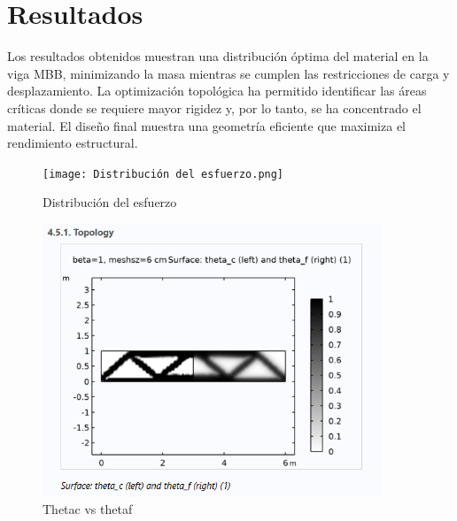 \documentclass{article}
\theoremstyle{mytheoremstyle}
\theoremstyle{mytheoremstyle}
\theoremstyle{myproblemstyle}
\begin{document}
\section{Resultados}
Los resultados obtenidos muestran una distribución óptima del material en la viga MBB, minimizando la masa mientras se cumplen las restricciones de carga y desplazamiento. La optimización topológica ha permitido identificar las áreas críticas donde se requiere mayor rigidez y, por lo tanto, se ha concentrado el material. El diseño final muestra una geometría eficiente que maximiza el rendimiento estructural.
 \begin{figure}[H]
              \centering
              \texttt{[image: Distribución del esfuerzo.png]}
              \caption{Distribución del esfuerzo}
              \label{fig:resultados_esfuerzo}
            \end{figure}
             \begin{figure}[H]
              \centering
              \includegraphics[width=0.9\textwidth]{Thetac.png}
              \caption{Thetac vs thetaf} 
              \label{fig:resultados_thetac_vs_thetaf}
            \end{figure}
\end{document}

